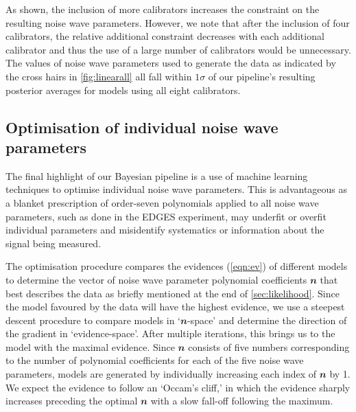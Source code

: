 As shown, the inclusion of more calibrators increases the constraint on the resulting noise wave parameters. However, we note that after the inclusion of four calibrators, the relative additional constraint decreases with each additional calibrator and thus the use of a large number of calibrators would be unnecessary. The values of noise wave parameters used to generate the data as indicated by the cross hairs in \cref{fig:linearall} all fall within $1\sigma$ of our pipeline's resulting posterior averages for models using all eight calibrators.


\subsection{Optimisation of individual noise wave parameters}\label{sec:opt}
The final highlight of our Bayesian pipeline is a use of machine learning techniques to optimise individual noise wave parameters. This is advantageous as a blanket prescription of order-seven polynomials applied to all noise wave parameters, such as done in the EDGES experiment, may underfit or overfit individual parameters and misidentify systematics or information about the signal being measured.

The optimisation procedure compares the evidences (\cref{eqn:ev}) of different models to determine the vector of noise wave parameter polynomial coefficients $\mathbfit{n}$ that best describes the data as briefly mentioned at the end of \cref{sec:likelihood}. Since the model favoured by the data will have the highest evidence, we use a steepest descent procedure to compare models in `$\mathbfit{n}$-space' and determine the direction of the gradient in `evidence-space'. After multiple iterations, this brings us to the model with the maximal evidence. Since $\mathbfit{n}$ consists of five numbers corresponding to the number of polynomial coefficients for each of the five noise wave parameters, models are generated by individually increasing each index of $\mathbfit{n}$ by 1. We expect the evidence to follow an `Occam's cliff,' in which the evidence sharply increases preceding the optimal $\mathbfit{n}$ with a slow fall-off following the maximum.

